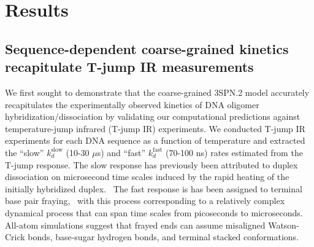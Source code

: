 \documentclass[journal=jpcbfk,manuscript=article]{achemso}
\begin{document}


\section{\label{sec:Results}Results}

\subsection{Sequence-dependent coarse-grained kinetics recapitulate T-jump IR measurements} \label{sec:time}


We first sought to demonstrate that the coarse-grained 3SPN.2 model accurately recapitulates the experimentally observed kinetics of DNA oligomer hybridization/dissociation by validating our computational predictions against temperature-jump infrared (T-jump IR) experiments. We conducted T-jump IR experiments for each DNA sequence as a function of temperature and extracted the ``slow'' $k_d^\mathrm{slow}$ (10-30 $\mu$s) and ``fast'' $k_d^\mathrm{fast}$ (70-100 ns) rates estimated from the T-jump response. The slow response has previously been attributed to duplex dissociation on microsecond time scales induced by the rapid heating of the initially hybridized duplex.~\citep{Sanstead2016, Sanstead2018DirectDehybridization} The fast response is has been assigned to terminal base pair fraying,~\citep{Sanstead2016, Sanstead2018DirectDehybridization} with this process corresponding to a relatively complex dynamical process that can span time scales from picoseconds to microseconds.~\cite{Nonin1995TerminalFraying, Nikolova2012ProbingSimulations, Andreatta2006UltrafastHelix, Galindo-Murillo2015ConvergenceDGCACGAACGAACGAACGC} All-atom simulations suggest that frayed ends can assume misaligned Watson-Crick bonds, base-sugar hydrogen bonds, and terminal stacked conformations.~\citep{PinamontiTheModels, Zgarbova2014BaseRNA} 
\end{document}
